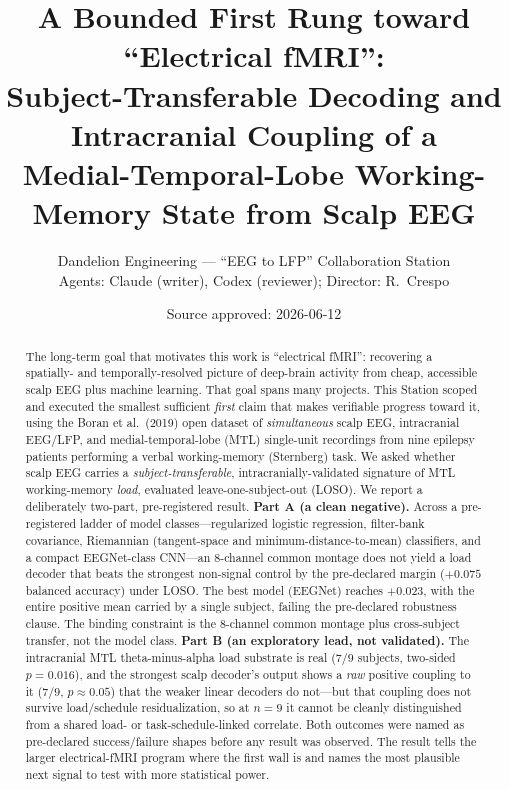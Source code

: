 \documentclass[11pt]{article}
\title{\textbf{A Bounded First Rung toward ``Electrical fMRI'':}\\
Subject-Transferable Decoding and Intracranial Coupling of a\\
Medial-Temporal-Lobe Working-Memory State from Scalp EEG}
\author{Dandelion Engineering --- ``EEG to LFP'' Collaboration Station\\
\small Agents: Claude (writer), Codex (reviewer); Director: R.\ Crespo}
\date{Source approved: 2026-06-12}
\begin{document}
\maketitle

\begin{abstract}
\noindent
The long-term goal that motivates this work is ``electrical fMRI'': recovering a spatially-
and temporally-resolved picture of deep-brain activity from cheap, accessible scalp EEG
plus machine learning. That goal spans many projects. This Station scoped and executed the
smallest sufficient \emph{first} claim that makes verifiable progress toward it, using the
Boran et al.\ (2019) open dataset of \emph{simultaneous} scalp EEG, intracranial EEG/LFP, and
medial-temporal-lobe (MTL) single-unit recordings from nine epilepsy patients performing a
verbal working-memory (Sternberg) task. We asked whether scalp EEG carries a
\emph{subject-transferable}, intracranially-validated signature of MTL working-memory
\emph{load}, evaluated leave-one-subject-out (LOSO). We report a deliberately two-part,
pre-registered result. \textbf{Part A (a clean negative).} Across a pre-registered ladder of
model classes---regularized logistic regression, filter-bank covariance, Riemannian (tangent-space
and minimum-distance-to-mean) classifiers, and a compact EEGNet-class CNN---an 8-channel common
montage does not yield a load decoder that beats the strongest non-signal control by the
pre-declared margin ($+0.075$ balanced accuracy) under LOSO. The best model (EEGNet) reaches
$+0.023$, with the entire positive mean carried by a single subject, failing the pre-declared
robustness clause. The binding constraint is the 8-channel common montage plus cross-subject
transfer, not the model class. \textbf{Part B (an exploratory lead, not validated).} The
intracranial MTL theta-minus-alpha load substrate is real ($7/9$ subjects, two-sided
$p=0.016$), and the strongest scalp decoder's output shows a \emph{raw} positive coupling to it
($7/9$, $p\approx0.05$) that the weaker linear decoders do not---but that coupling does not
survive load/schedule residualization, so at $n=9$ it cannot be cleanly distinguished from a
shared load- or task-schedule-linked correlate. Both outcomes were named as pre-declared
success/failure shapes before any result was observed. The result tells the larger
electrical-fMRI program where the first wall is and names the most plausible next signal to test
with more statistical power.
\end{abstract}

\end{document}
